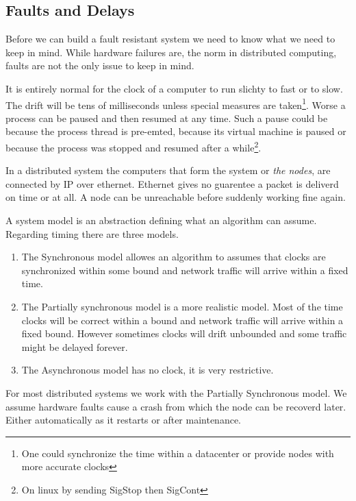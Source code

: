 \subsection{Faults and Delays}
Before we can build a fault resistant system we need to know what we need to keep in mind. While hardware failures are, the norm in distributed computing, faults are not the only issue to keep in mind. 

It is entirely normal for the clock of a computer to run slichty to fast or to slow. The drift will be tens of milliseconds \cite{time} unless special measures are taken\footnote{One could synchronize the time within a datacenter or provide nodes with more accurate clocks}. Worse a process can be paused and then resumed at any time. Such a pause could be because the process thread is pre-emted, because its virtual machine is paused or because the process was stopped and resumed after a while\footnote{On linux by sending SigStop then SigCont}. 

In a distributed system the computers that form the system or \textit{the nodes}, are connected by IP over ethernet. Ethernet gives no guarentee a packet is deliverd on time or at all. A node can be unreachable before suddenly working fine again.

A system model is an abstraction defining what an algorithm can assume. Regarding timing there are three models. 
\begin{enumerate}
	\item The Synchronous model allowes an algorithm to assumes that clocks are synchronized within some bound and network traffic will arrive within a fixed time.
	\item The Partially synchronous model is a more realistic model. Most of the time clocks will be correct within a bound and network traffic will arrive within a fixed bound. However sometimes clocks will drift unbounded and some traffic might be delayed forever.
	\item The Asynchronous model has no clock, it is very restrictive.
\end{enumerate}

For most distributed systems we work with the Partially Synchronous model. We assume hardware faults cause a crash from which the node can be recoverd later. Either automatically as it restarts or after maintenance.


